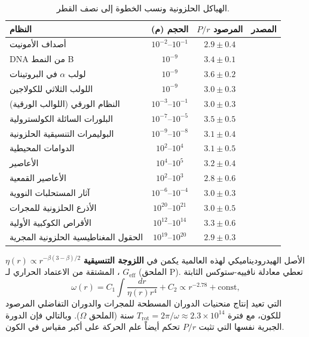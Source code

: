 \documentclass[11pt,a4paper]{article}
\newcommand{\ar}[1]{\foreignlanguage{arabic}{#1}}
\begin{document}
	\begin{table}[H]
		\centering
		\caption{\ar{الهياكل الحلزونية ونسب الخطوة إلى نصف القطر.}}
		\label{tab:spiral-examples}
		\small
		\begin{tabular}{@{}l c c c@{}}
			\toprule
			\textbf{\ar{النظام}} & \textbf{\ar{الحجم (م)}} & \textbf{\ar{\(P/r\) المرصود}} & \textbf{\ar{المصدر}} \\
			\midrule
			\ar{أصداف الأمونيت} & \(10^{-2}\)–\(10^{-1}\) & \(2.9 \pm 0.4\) & \cite{ammonites} \\
			\ar{DNA من النمط B} & \(10^{-9}\) & \(3.4 \pm 0.1\) & \cite{watsoncrick} \\
			\ar{لولب \(\alpha\) في البروتينات} & \(10^{-9}\) & \(3.6 \pm 0.2\) & \cite{pauling} \\
			\ar{اللولب الثلاثي للكولاجين} & \(10^{-9}\) & \(3.0 \pm 0.3\) & \cite{collagen} \\
			\ar{النظام الورقي (اللوالب الورقية)} & \(10^{-3}\)–\(10^{-1}\) & \(3.0 \pm 0.3\) & \cite{phyllotaxis} \\
			\ar{البلورات السائلة الكولسترولية} & \(10^{-7}\)–\(10^{-5}\) & \(3.5 \pm 0.5\) & \cite{cholesteric} \\
			\ar{البوليمرات التنسيقية الحلزونية} & \(10^{-9}\)–\(10^{-8}\) & \(3.1 \pm 0.4\) & \cite{helical-mof} \\
			\ar{الدوامات المحيطية} & \(10^{2}\)–\(10^{4}\) & \(3.1 \pm 0.5\) & \cite{ocean-eddies} \\
			\ar{الأعاصير} & \(10^{4}\)–\(10^{5}\) & \(3.2 \pm 0.4\) & \cite{hurricanes} \\
			\ar{الأعاصير القمعية} & \(10^{2}\)–\(10^{3}\) & \(2.8 \pm 0.6\) & \cite{tornadoes} \\
			\ar{آثار المستحلبات النووية} & \(10^{-6}\)–\(10^{-4}\) & \(3.0 \pm 0.3\) & \cite{nuclear-tracks} \\
			\ar{الأذرع الحلزونية للمجرات} & \(10^{20}\)–\(10^{21}\) & \(3.0 \pm 0.5\) & \cite{binney-tremaine} \\
			\ar{الأقراص الكوكبية الأولية} & \(10^{12}\)–\(10^{14}\) & \(3.3 \pm 0.6\) & \cite{ppdisk} \\
			\ar{الحقول المغناطيسية الحلزونية المجرية} & \(10^{19}\)–\(10^{20}\) & \(2.9 \pm 0.3\) & \cite{beck} \\
			\bottomrule
		\end{tabular}
	\end{table}
	
	\ar{الأصل الهيدروديناميكي لهذه العالمية يكمن في \textbf{اللزوجة التنسيقية} \(\eta(r) \propto r^{-\beta(3-\beta)/2}\)، المشتقة من الاعتماد الحراري لـ \(G_{\mathrm{eff}}\) (الملحق P). تعطي معادلة نافييه-ستوكس الثابتة}
	\[
	\omega(r) = C_1 \int \frac{dr}{\eta(r) r^4} + C_2 \propto r^{-2.78} + \text{const},
	\]
	\ar{التي تعيد إنتاج منحنيات الدوران المسطحة للمجرات والدوران التفاضلي المرصود للكون، مع فترة \(T_{\mathrm{rot}} = 2\pi/\omega \approx 2.3\times10^{14}\) سنة (الملحق \(\Omega\)). وبالتالي فإن الدورة الجبرية نفسها التي تثبت \(P/r\) تحكم أيضاً علم الحركة على أكبر مقياس في الكون.}
	
\end{document}
